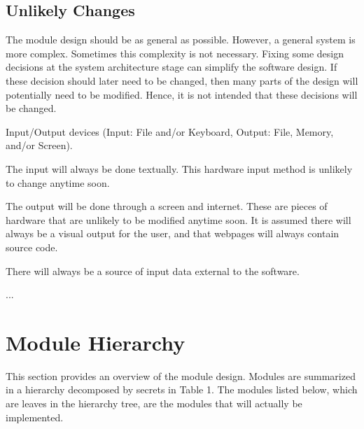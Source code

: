 \documentclass[12pt, titlepage]{article}
\newcounter{ucnum}
\newcommand{\uctheucnum}{UC\theucnum}
\begin{document}
\subsection{Unlikely Changes} \label{SecUchange}
The module design should be as general as possible. However, a general system is
more complex. Sometimes this complexity is not necessary. Fixing some design
decisions at the system architecture stage can simplify the software design. If
these decision should later need to be changed, then many parts of the design
will potentially need to be modified. Hence, it is not intended that these
decisions will be changed.
\begin{description}
\item[ \uctheucnum \label{ucIO}:] Input/Output devices
  (Input: File and/or Keyboard, Output: File, Memory, and/or Screen).

The input will always be done textually. This hardware input method is unlikely to change anytime soon.

The output will be done through a screen and internet. These are pieces of hardware that are unlikely to be modified anytime soon. It is assumed there will always be a visual output for the user, and that webpages will always contain source code.
\item[ \uctheucnum \label{ucInput}:] There will always be
  a source of input data external to the software.
\item ... %
\end{description}
\section{Module Hierarchy} \label{SecMH}
This section provides an overview of the module design. Modules are summarized
in a hierarchy decomposed by secrets in Table 1. The modules listed
below, which are leaves in the hierarchy tree, are the modules that will
actually be implemented.
\end{document}
